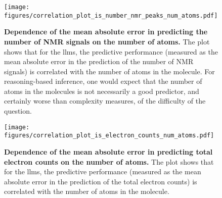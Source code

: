 \begin{figure}
    \centering
    \texttt{[image: figures/correlation\_plot\_is\_number\_nmr\_peaks\_num\_atoms.pdf]}
    \caption{\textbf{Dependence of the mean absolute error in predicting the number of NMR signals on the number of atoms.} The plot shows that for the \glspl{llm}, the predictive performance (measured as the mean absolute error in the prediction of the number of NMR signals) is correlated with the number of atoms in the molecule. 
    For reasoning-based inference, one would expect that the number of atoms in the molecules is not necessarily a good predictor, and certainly worse than complexity measures, of the difficulty of the question.}
    \label{fig:correlation_plot_is_number_nmr_peaks_num_atoms}
\end{figure}


\begin{figure}
    \centering
    \texttt{[image: figures/correlation\_plot\_is\_electron\_counts\_num\_atoms.pdf]}
    \caption{\textbf{Dependence of the mean absolute error in predicting total electron counts on the number of atoms.} The plot shows that for the \glspl{llm}, the predictive performance (measured as the mean absolute error in the prediction of the total electron counts) is correlated with the number of atoms in the molecule.}
    \label{fig:correlation_plot_is_electron_counts_num_atoms}
\end{figure}

